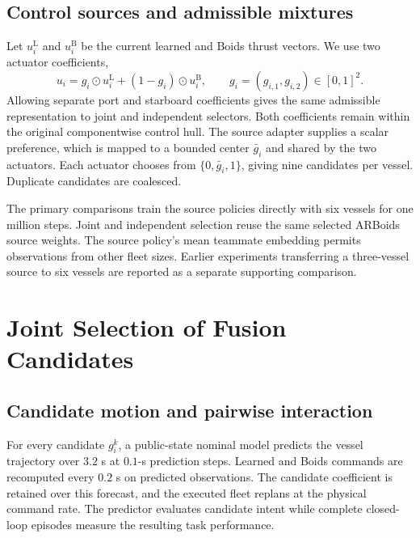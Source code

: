 \documentclass[journal]{IEEEtran}
\begin{document}
\subsection{Control sources and admissible mixtures}
Let $u_i^{\mathrm{L}}$ and $u_i^{\mathrm{B}}$ be the current learned and Boids thrust vectors. We use two actuator coefficients,
\begin{equation}
 u_i=g_i\odot u_i^{\mathrm{L}}+(1-g_i)\odot u_i^{\mathrm{B}},
 \qquad g_i=(g_{i,1},g_{i,2})\in[0,1]^2 .
 \label{eq:mix}
\end{equation}
Allowing separate port and starboard coefficients gives the same admissible representation to joint and independent selectors. Both coefficients remain within the original componentwise control hull. The source adapter supplies a scalar preference, which is mapped to a bounded center $\bar g_i$ and shared by the two actuators. Each actuator chooses from $\{0,\bar g_i,1\}$, giving nine candidates per vessel. Duplicate candidates are coalesced.

The primary comparisons train the source policies directly with six vessels for one million steps. Joint and independent selection reuse the same selected ARBoids source weights. The source policy's mean teammate embedding permits observations from other fleet sizes. Earlier experiments transferring a three-vessel source to six vessels are reported as a separate supporting comparison.

\section{Joint Selection of Fusion Candidates}
\subsection{Candidate motion and pairwise interaction}
For every candidate $g_i^k$, a public-state nominal model predicts the vessel trajectory over $3.2$ s at $0.1$-s prediction steps. Learned and Boids commands are recomputed every $0.2$ s on predicted observations. The candidate coefficient is retained over this forecast, and the executed fleet replans at the physical command rate. The predictor evaluates candidate intent while complete closed-loop episodes measure the resulting task performance.
\end{document}
